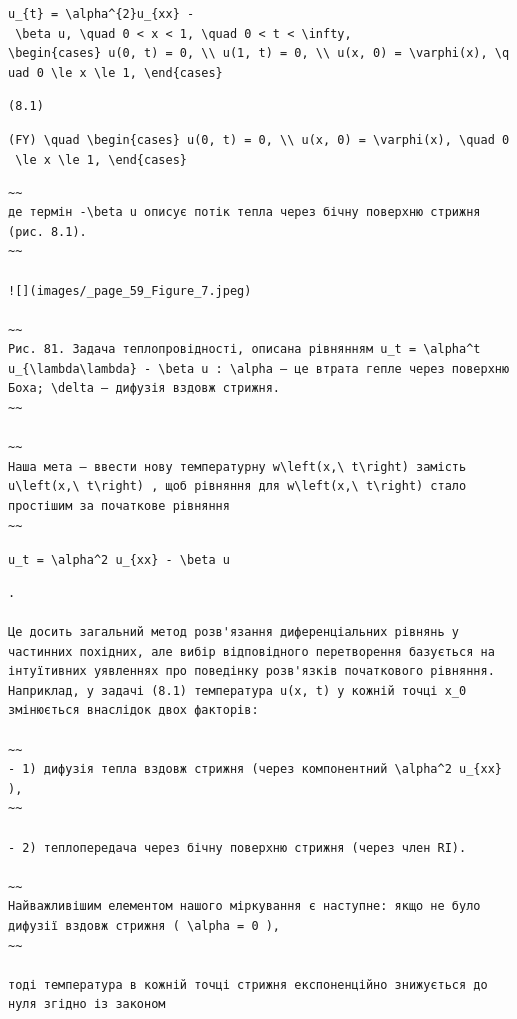 \documentclass[
  ukrainian,
]{article}
\begin{document}
\texttt{u\_\{t\}\ =\ \textbackslash{}alpha\^{}\{2\}u\_\{xx\}\ -\ \textbackslash{}beta\ u,\ \textbackslash{}quad\ 0\ \textless{}\ x\ \textless{}\ 1,\ \textbackslash{}quad\ 0\ \textless{}\ t\ \textless{}\ \textbackslash{}infty,}
\texttt{\textbackslash{}begin\{cases\}\ u(0,\ t)\ =\ 0,\ \textbackslash{}\textbackslash{}\ u(1,\ t)\ =\ 0,\ \textbackslash{}\textbackslash{}\ u(x,\ 0)\ =\ \textbackslash{}varphi(x),\ \textbackslash{}quad\ 0\ \textbackslash{}le\ x\ \textbackslash{}le\ 1,\ \textbackslash{}end\{cases\}}

\begin{verbatim}
(8.1)
\end{verbatim}

\texttt{(FY)\ \textbackslash{}quad\ \textbackslash{}begin\{cases\}\ u(0,\ t)\ =\ 0,\ \textbackslash{}\textbackslash{}\ u(x,\ 0)\ =\ \textbackslash{}varphi(x),\ \textbackslash{}quad\ 0\ \textbackslash{}le\ x\ \textbackslash{}le\ 1,\ \textbackslash{}end\{cases\}}

\begin{verbatim}
~~
де термін -\beta u описує потік тепла через бічну поверхню стрижня (рис. 8.1).
~~

![](images/_page_59_Figure_7.jpeg)

~~
Рис. 81. Задача теплопровідності, описана рівнянням u_t = \alpha^t u_{\lambda\lambda} - \beta u : \alpha — це втрата гепле через поверхню Боха; \delta – дифузія вздовж стрижня.
~~

~~
Наша мета — ввести нову температурну w\left(x,\ t\right) замість u\left(x,\ t\right) , щоб рівняння для w\left(x,\ t\right) стало простішим за початкове рівняння
~~
\end{verbatim}

\texttt{u\_t\ =\ \textbackslash{}alpha\^{}2\ u\_\{xx\}\ -\ \textbackslash{}beta\ u}

\begin{verbatim}
.

Це досить загальний метод розв'язання диференціальних рівнянь у частинних похідних, але вибір відповідного перетворення базується на інтуїтивних уявленнях про поведінку розв'язків початкового рівняння. Наприклад, у задачі (8.1) температура u(x, t) у кожній точці x_0 змінюється внаслідок двох факторів:

~~
- 1) дифузія тепла вздовж стрижня (через компонентний \alpha^2 u_{xx} ),
~~

- 2) теплопередача через бічну поверхню стрижня (через член RI).

~~
Найважливішим елементом нашого міркування є наступне: якщо не було дифузії вздовж стрижня ( \alpha = 0 ),
~~

тоді температура в кожній точці стрижня експоненційно знижується до нуля згідно із законом
\end{verbatim}
\end{document}

